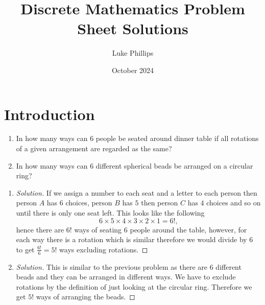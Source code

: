 \documentclass[10pt, a4paper]{article}
\title{Discrete Mathematics Problem Sheet Solutions}
\author{Luke Phillips}
\date{October 2024}
\begin{document}
\maketitle

\newpage

\section{Introduction}

\begin{problem}[Q10]\phantom{}
    \begin{enumerate}[label = (\alph*)]
        \item In how many ways can $6$ people be seated around dinner table if all rotations of a given arrangement are regarded as the same?
        \item In how many ways can $6$ different spherical beads be arranged on a circular ring?
    \end{enumerate}
    \begin{enumerate}[label = (\alph*)]
        \item 
        \begin{proof}[Solution]\renewcommand{\qedsymbol}{}
            If we assign a number to each seat and a letter to each person then person $A$ has $6$ choices, person $B$ has $5$ then person $C$ has $4$ choices and so on until there is only one seat left. This looks like the following
            \[
            6 \times 5 \times 4 \times 3 \times 2 \times 1 = 6!,
            \]
            hence there are $6!$ ways of seating $6$ people around the table, however, for each way there is a rotation which is similar therefore we would divide by $6$ to get $\frac{6!}{6} = 5!$ ways excluding rotations.
        \end{proof}
        \item
        \begin{proof}[Solution]\renewcommand{\qedsymbol}{}
            This is similar to the previous problem as there are $6$ different beads and they can be arranged in different ways. We have to exclude rotations by the definition of just looking at the circular ring. Therefore we get $5!$ ways of arranging the beads.
        \end{proof}
    \end{enumerate}
\end{problem}

\newpage
\end{document}
